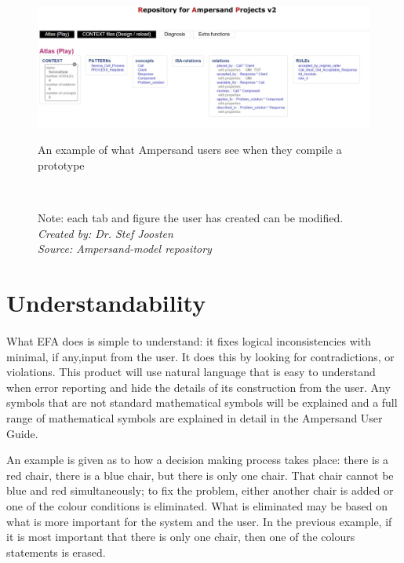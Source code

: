 \documentclass[12pt]{report}
\begin{document}
\begin{figure}
	\centering
	\includegraphics[width=1.0\textwidth]{../figures/Ampersandmodel}
	\caption{An example of what Ampersand users see when they compile a 
	prototype}
        {\captionsetup{font=small}\caption*{Note: each tab and 
	figure the user has created can be modified. \\ \textit{Created by: Dr. 
	Stef 
	Joosten \\Source: Ampersand-model 
	repository}}}
 ~\label{fig:figure3}
\end{figure}


\section{Understandability}
\paragraph*{}
What EFA does is simple to understand: it fixes logical inconsistencies with 
minimal, if any,input from the user. It does this by looking for 
contradictions, or violations. This product will use natural language that is 
easy to understand when error reporting and hide the details of its 
construction from the user. Any symbols that are not standard mathematical 
symbols will be explained and a full range of mathematical symbols are 
explained in detail in the Ampersand User Guide. 

An example is given as to how a decision making process takes place: there is a 
red chair, there is a blue chair, but there is only one chair. That chair 
cannot be blue and red simultaneously; to fix the problem, either another chair 
is added or one of the colour conditions is eliminated. What is eliminated may 
be based on what is more important for the system and the user. In the previous 
example, if it is most important that there is only one chair, then one of the 
colours statements is erased. 
\end{document}
